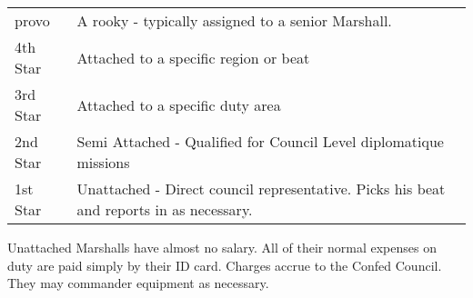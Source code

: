 \documentclass{article}
\begin{document}
\begin{tabular}{||l|l||}
provo	 & A rooky - typically assigned to a senior Marshall. \\
4th Star & Attached to a specific region or beat   \\
3rd Star & Attached to a specific duty area \\
2nd Star & Semi Attached - Qualified for Council Level diplomatique missions \\
1st Star & Unattached - Direct council representative. Picks his beat and reports in as necessary. \\
\end{tabular}

Unattached Marshalls have almost no salary. All of their normal 
expenses on duty are paid simply by their ID card. Charges accrue to 
the Confed  Council. They may commander equipment as necessary.
\end{document}
